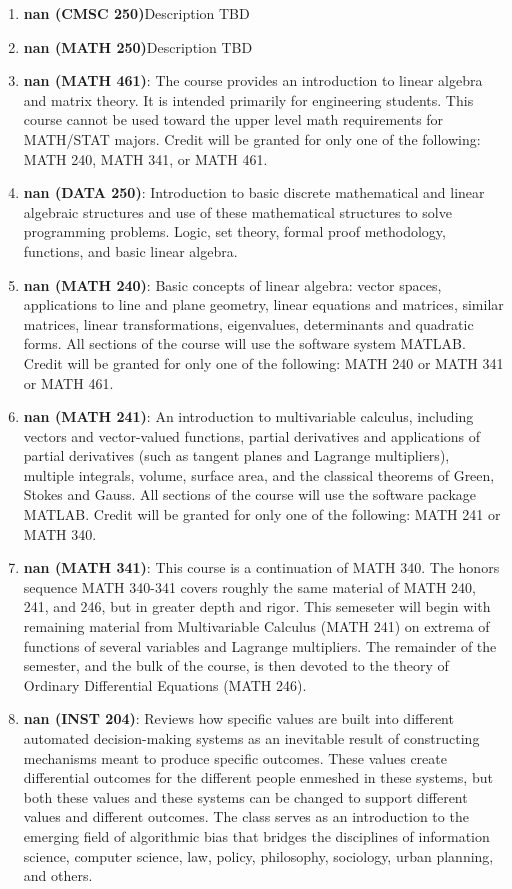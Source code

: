 \begin{enumerate}
\item \textbf{nan (CMSC 250)}Description TBD
\item \textbf{nan (MATH 250)}Description TBD
\item \textbf{nan (MATH 461)}: The course provides an introduction to linear algebra and matrix theory. It is intended primarily for engineering students. This course cannot be used toward the upper level math requirements for MATH/STAT majors. Credit will be granted for only one of the following: MATH 240, MATH 341, or MATH 461.
\item \textbf{nan (DATA 250)}:  Introduction to basic discrete mathematical and linear algebraic structures and use of these mathematical structures to solve programming problems. Logic, set theory, formal proof methodology, functions, and basic linear algebra.
\item \textbf{nan (MATH 240)}: Basic concepts of linear algebra: vector spaces, applications to line and plane geometry, linear equations and matrices, similar matrices, linear transformations, eigenvalues, determinants and quadratic forms. All sections of the course will use the software system MATLAB. Credit will be granted for only one of the following: MATH 240 or MATH 341 or MATH 461.
\item \textbf{nan (MATH 241)}: An introduction to multivariable calculus, including vectors and vector-valued functions, partial derivatives and applications of partial derivatives (such as tangent planes and Lagrange multipliers), multiple integrals, volume, surface area, and the classical theorems of Green, Stokes and Gauss. All sections of the course will use the software package MATLAB. Credit will be granted for only one of the following: MATH 241 or MATH 340.
\item \textbf{nan (MATH 341)}: This course is a continuation of MATH 340. The honors sequence MATH 340-341 covers roughly the same material of MATH 240, 241, and 246, but in greater depth and rigor. This semeseter will begin with remaining material from Multivariable Calculus (MATH 241) on extrema of functions of several variables and Lagrange multipliers. The remainder of the semester, and the bulk of the course, is then devoted to the theory of Ordinary Differential Equations (MATH 246).
\item \textbf{nan (INST 204)}: Reviews how specific values are built into different automated decision-making systems as an inevitable result of constructing mechanisms meant to produce specific outcomes. These values create differential outcomes for the different people enmeshed in these systems, but both these values and these systems can be changed to support different values and different outcomes. The class serves as an introduction to the emerging field of algorithmic bias that bridges the disciplines of information science, computer science, law, policy, philosophy, sociology, urban planning, and others.

\end{enumerate}
